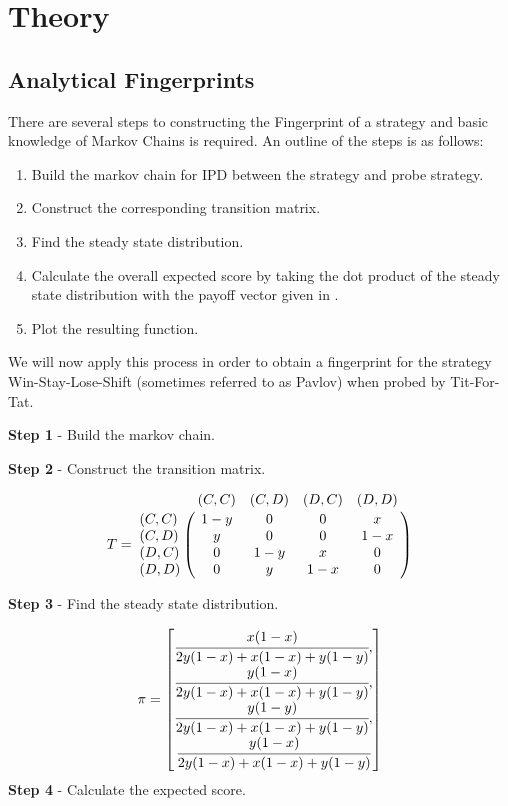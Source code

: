 
\chapter{Theory}\label{cha:theory}

\section{Analytical Fingerprints}
There are several steps to constructing the Fingerprint of a strategy and basic knowledge of Markov Chains is required.
An outline of the steps is as follows:

\begin{enumerate}
    \item Build the markov chain for IPD between the strategy and probe strategy.
    \item Construct the corresponding transition matrix.
    \item Find the steady state distribution.
    \item Calculate the overall expected score by taking the dot product of the steady state distribution with the payoff vector given in .
    \item Plot the resulting function.
\end{enumerate}

We will now apply this process in order to obtain a fingerprint for the strategy Win-Stay-Lose-Shift (sometimes referred to as Pavlov) when probed by Tit-For-Tat.

\textbf{Step 1} - Build the markov chain.

\textbf{Step 2} - Construct the transition matrix.

\begin{equation}\label{eq:transition_matrix}
%
T = \bordermatrix{~      & (C, C) & (C, D) & (D, C) & (D, D) \cr
                  (C, C) & 1 - y  & 0      & 0      & x      \cr
                  (C, D) & y      & 0      & 0      & 1 - x  \cr
                  (D, C) & 0      & 1 - y  & x      & 0      \cr
                  (D, D) & 0      & y      & 1 - x  & 0}
%
\end{equation}

\textbf{Step 3} - Find the steady state distribution.

\begin{equation}\label{eq:steady_state}
%
\pi =
\begin{bmatrix}
\cfrac{x (1 - x)}{2y(1-x) + x(1-x) + y(1-y)}, \\
\cfrac{y (1 - x)}{2y(1-x) + x(1-x) + y(1-y)}, \\
\cfrac{y (1 - y)}{2y(1-x) + x(1-x) + y(1-y)}, \\
\cfrac{y (1 - x)}{2y(1-x) + x(1-x) + y(1-y)}
\end{bmatrix}
\end{equation}
\textbf{Step 4} - Calculate the expected score.

